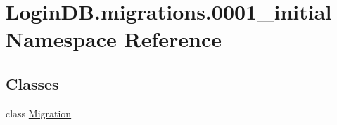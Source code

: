 \hypertarget{namespace_login_d_b_1_1migrations_1_10001__initial}{}\section{Login\+D\+B.\+migrations.0001\+\_\+initial Namespace Reference}
\label{namespace_login_d_b_1_1migrations_1_10001__initial}
\subsection*{Classes}
\begin{DoxyCompactItemize}
\item 
class \hyperlink{class_login_d_b_1_1migrations_1_10001__initial_1_1_migration}{Migration}
\end{DoxyCompactItemize}
